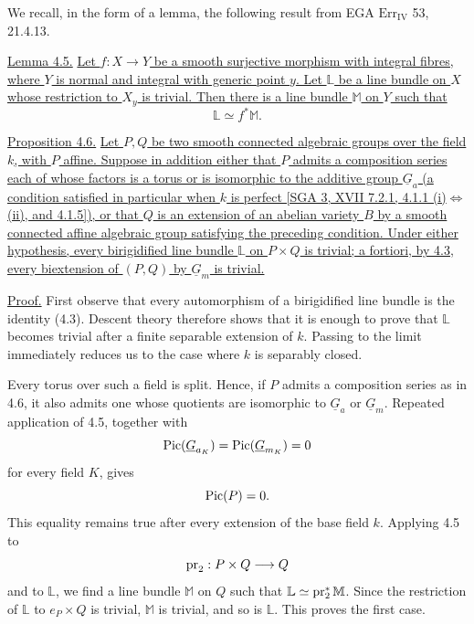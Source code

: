 
We recall, in the form of a lemma, the following result from EGA
$\mathrm{Err}_{\mathrm{IV}}$ 53, 21.4.13.

\medskip
\noindent\underline{Lemma 4.5.}  \underline{Let
$f:X\longrightarrow Y$ be a smooth surjective morphism with integral
fibres, where $Y$ is normal and integral with generic point $y$.  Let
$\mathbb L$ be a line bundle on $X$ whose restriction to $X_y$ is
trivial.  Then there is a line bundle $\mathbb M$ on $Y$ such that}
\[
 \mathbb L\simeq f^*\mathbb M.
\]

\medskip
\noindent\underline{Proposition 4.6.}  \underline{Let $P,Q$ be two
smooth connected algebraic groups over the field $k$, with $P$
affine.  Suppose in addition either that $P$ admits a composition
series each of whose factors is a torus or is isomorphic to the
additive group $\underline G_a$ (a condition satisfied in particular
when $k$ is perfect [SGA 3, XVII 7.2.1, 4.1.1 (i)$\Longleftrightarrow$
(ii), and 4.1.5]), or that $Q$ is an extension of an abelian variety
$B$ by a smooth connected affine algebraic group satisfying the
preceding condition.  Under either hypothesis, every birigidified
line bundle $\mathbb L$ on $P\times Q$ is trivial; a fortiori, by
4.3, every biextension of $(P,Q)$ by $\underline G_m$ is trivial.}

\noindent\underline{Proof.}  First observe that every automorphism of
a birigidified line bundle is the identity (4.3).  Descent theory
therefore shows that it is enough to prove that $\mathbb L$ becomes
trivial after a finite separable extension of $k$.  Passing to the
limit immediately reduces us to the case where $k$ is separably
closed.

Every torus over such a field is split.  Hence, if $P$ admits a
composition series as in 4.6, it also admits one whose quotients are
isomorphic to $\underline G_a$ or $\underline G_m$.  Repeated
application of 4.5, together with
\[
 \Pic(\underline G_{a_K})=\Pic(\underline G_{m_K})=0
\]
for every field $K$, gives
\[
 \operatorname{Pic}(P)=0.
\]
This equality remains true after every extension of the base field
$k$.  Applying 4.5 to
\[
 \operatorname{pr}_2:P\times Q\longrightarrow Q
\]
and to $\mathbb L$, we find a line bundle $\mathbb M$ on $Q$ such
that $\mathbb L\simeq\operatorname{pr}_2^*\mathbb M$.  Since the restriction of
$\mathbb L$ to $e_P\times Q$ is trivial, $\mathbb M$ is trivial, and
so is $\mathbb L$.  This proves the first case.

